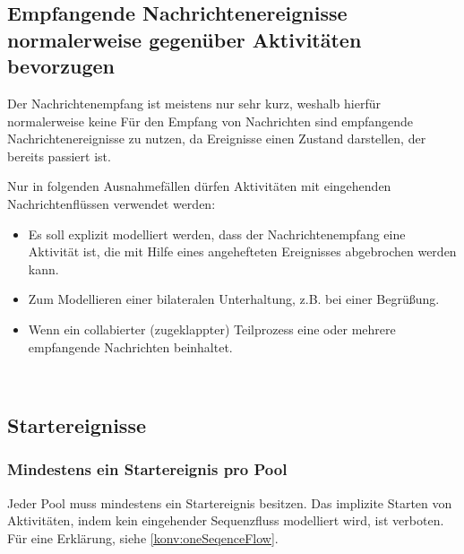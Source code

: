 \documentclass[12pt,report]{snetTeaching}
\begin{document}
\begin{Rahmen}
	\hfill
\end{Rahmen}


\clearpage
\subsection{Empfangende Nachrichtenereignisse normalerweise gegenüber Aktivitäten bevorzugen}
\label{konv:receivingMessageEvents}

Der Nachrichtenempfang ist meistens nur sehr kurz, weshalb hierfür normalerweise keine 
Für den Empfang von Nachrichten sind empfangende Nachrichtenereignisse zu nutzen, da Ereignisse einen Zustand darstellen, der bereits passiert ist.


Nur in folgenden Ausnahmefällen dürfen Aktivitäten mit eingehenden Nachrichtenflüssen verwendet werden:
\begin{itemize}
	\item Es soll explizit modelliert werden, dass der Nachrichtenempfang eine Aktivität ist, die mit Hilfe eines angehefteten Ereignisses abgebrochen werden kann.
	\item Zum Modellieren einer bilateralen Unterhaltung, z.B. bei einer Begrüßung.
	\item Wenn ein collabierter (zugeklappter) Teilprozess eine oder mehrere empfangende Nachrichten beinhaltet. 
\end{itemize}

\begin{Rahmen}
	\hfill
	\\
	\hfill
\end{Rahmen}



\clearpage
\subsection{Startereignisse}

\subsubsection{Mindestens ein Startereignis pro Pool}
\label{konv:oneStartEvent}

Jeder Pool muss mindestens ein Startereignis besitzen. Das implizite Starten von Aktivitäten, indem kein eingehender Sequenzfluss modelliert wird, ist verboten. Für eine Erklärung, siehe \ref{konv:oneSeqenceFlow}.
\end{document}
